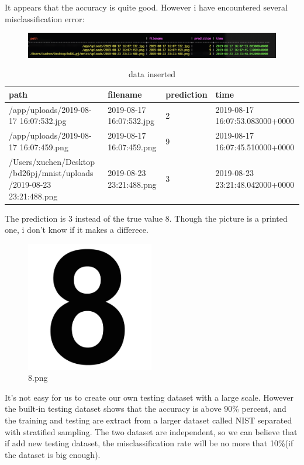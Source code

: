 \documentclass[12pt,hyperref,]{ctexart}
\begin{document}
It appears that the accuracy is quite good. However i have encountered
several misclassification error:

\begin{figure}[H]
\centering
\includegraphics[width=5in]{cass.png}
\end{figure}

\begin{table}[H]
\caption{data inserted}
\begin{center}
\begin{tabular}{|p{4cm}|p{3.5cm}|p{1.8cm}|p{4cm}|}
\hline
path & filename & prediction & time \\ \hline
/app/uploads/2019-08-17 16:07:532.jpg & 2019-08-17 16:07:532.jpg & 2 & 2019-08-17 16:07:53.083000+0000\\
/app/uploads/2019-08-17 16:07:459.png & 2019-08-17 16:07:459.png & 9 & 2019-08-17 16:07:45.510000+0000\\
/Users/xuchen/Desktop /bd26pj/mnist/uploads /2019-08-23 23:21:488.png & 2019-08-23 23:21:488.png & 3 & 2019-08-23 23:21:48.042000+0000\\ 
\hline
\end{tabular}
\end{center}
\end{table}

The prediction is 3 instead of the true value 8. Though the picture is a
printed one, i don't know if it makes a differece.

\begin{figure}[H]
\centering
\includegraphics[width=2.2in]{8.png}
\caption{8.png}
\end{figure}

It's not easy for us to create our own testing dataset with a large
scale. However the built-in testing dataset shows that the accuracy is
above 90\% percent, and the training and testing are extract from a
larger dataset called NIST separated with stratified sampling. The two
dataset are independent, so we can believe that if add new testing
dataset, the misclassification rate will be no more that 10\%(if the
dataset is big enough).
\end{document}
